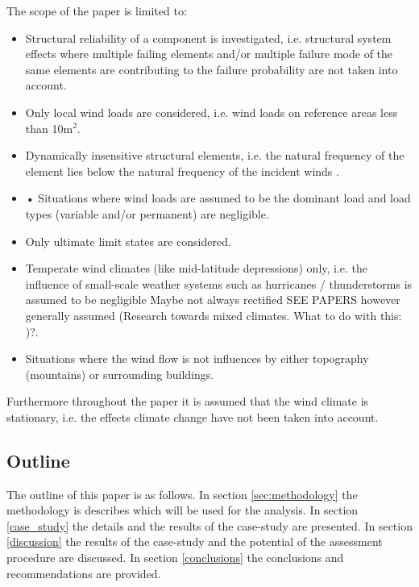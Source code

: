 \documentclass[fleqn]{article}
\begin{document}
The scope of the paper is limited to:
\begin{itemize}
	\item Structural reliability of a component is investigated, i.e. structural system effects where multiple failing elements and/or multiple failure mode of the same elements are contributing to the failure probability are not taken into account.
	\item Only local wind loads are considered, i.e. wind loads on reference areas less than 10m$^2$.
	\item Dynamically insensitive structural elements, i.e. the natural frequency of the element lies below the natural frequency of the incident winds  \cite{}.
	\item •	Situations where wind loads are assumed to be the dominant load and load types (variable and/or permanent) are negligible.
	\item Only ultimate limit states are considered.
	\item Temperate wind climates (like mid-latitude depressions) only, i.e. the influence of small-scale weather systems such as hurricanes / thunderstorms is assumed to be negligible Maybe not always rectified SEE PAPERS however generally assumed (Research towards mixed climates. What to do with this: \cite{Gomes_1978}\cite{Harris_2017})?.
	\item Situations where the wind flow is not influences by either topography (mountains) or surrounding buildings.
\end{itemize}

Furthermore throughout the paper it is assumed that  the wind climate is stationary, i.e. the effects climate change have not been taken into account. 

\subsection{Outline}

The outline of this paper is as follows. In section \ref{sec:methodology} the methodology is describes which will be used for the analysis. In section \ref{case_study} the details and the results of the case-study are presented. In section \ref{discussion} the results of the case-study and the potential of the assessment procedure are discussed. In section \ref{conclusions} the conclusions and recommendations are provided. 


\end{document}
